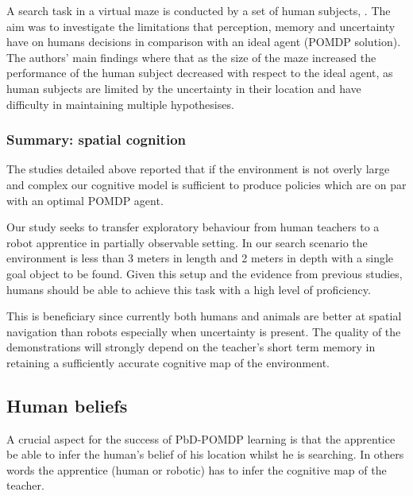 A search task in a virtual maze is conducted by a set of human subjects, \cite{stankiewicz2006lost}. The aim 
was to investigate the limitations that perception, memory and uncertainty have on humans decisions in comparison 
with an ideal agent (POMDP solution). The authors' main findings where that as the size of the maze increased the
performance of the human subject decreased with respect to the ideal agent, as human subjects are limited by the 
uncertainty in their location and have difficulty in maintaining multiple hypothesises.

\subsubsection{Summary: spatial cognition}


The studies detailed above reported that if the environment is not overly large and complex our cognitive model is sufficient 
to produce policies which are on par with an optimal POMDP agent. 

Our study seeks to transfer exploratory behaviour from human teachers to a robot apprentice in partially observable setting. 
In our search scenario the environment is less than 3 meters in length and 2 meters in depth with a single goal object to be found. 
Given this setup and the evidence from previous studies, humans should be able to achieve this task with a high level of proficiency. 

This is beneficiary since currently both humans and animals are better at spatial navigation than robots \cite{stankiewicz2006lost} 
especially when uncertainty is present. The quality of the demonstrations will strongly depend on the teacher's short term memory 
in retaining a sufficiently accurate cognitive map of the environment. 


\subsection{Human beliefs}


A crucial aspect for the success of PbD-POMDP learning is that the apprentice be able to infer 
the human's belief of his location whilst he is searching. In others words the apprentice
(human or robotic) has to infer the cognitive map of the teacher. 



